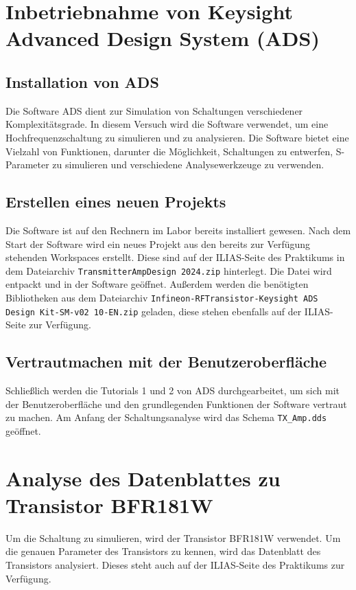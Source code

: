 \section{Inbetriebnahme von Keysight Advanced Design System (ADS)}
\subsection{Installation von ADS}
Die Software \ac{ADS} dient zur Simulation von Schaltungen verschiedener Komplexitätsgrade. 
In diesem Versuch wird die Software verwendet, um eine Hochfrequenzschaltung zu simulieren und zu analysieren. 
Die Software bietet eine Vielzahl von Funktionen, darunter die Möglichkeit, Schaltungen zu entwerfen, S-Parameter zu simulieren und verschiedene Analysewerkzeuge zu verwenden.

\subsection{Erstellen eines neuen Projekts}
Die Software ist auf den Rechnern im Labor bereits installiert gewesen. 
Nach dem Start der Software wird ein neues Projekt aus den bereits zur Verfügung stehenden Workspaces erstellt. 
Diese sind auf der ILIAS-Seite des Praktikums in dem Dateiarchiv \texttt{TransmitterAmpDesign 2024.zip} hinterlegt. 
Die Datei wird entpackt und in der Software geöffnet. Außerdem werden die benötigten Bibliotheken aus dem Dateiarchiv \texttt{Infineon-RFTransistor-Keysight ADS Design Kit-SM-v02 10-EN.zip} geladen, diese stehen ebenfalls auf der ILIAS-Seite zur Verfügung.
\subsection{Vertrautmachen mit der Benutzeroberfläche}
Schließlich werden die Tutorials 1 und 2 von \ac{ADS} durchgearbeitet, um sich mit der Benutzeroberfläche und den grundlegenden Funktionen der Software vertraut zu machen.
Am Anfang der Schaltungsanalyse wird das Schema \texttt{TX\_Amp.dds} geöffnet.

\section{Analyse des Datenblattes zu Transistor BFR181W}
Um die Schaltung zu simulieren, wird der Transistor BFR181W verwendet. Um die genauen Parameter des Transistors zu kennen, wird das Datenblatt des Transistors analysiert.
Dieses steht auch auf der ILIAS-Seite des Praktikums zur Verfügung.

